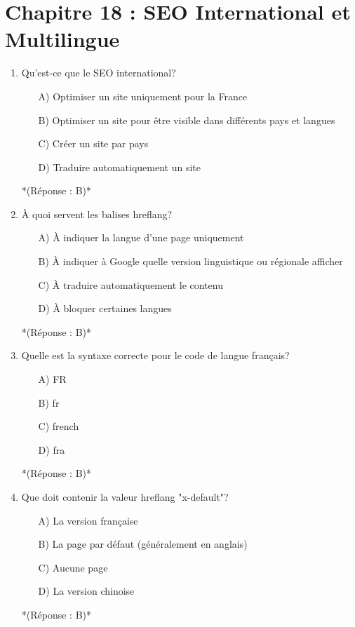 \documentclass[12pt,a4paper,twoside]{report}
\begin{document}
\section*{Chapitre 18 : SEO International et Multilingue}

\begin{enumerate}
\item Qu'est-ce que le SEO international?
\begin{itemize}
\item[A)] Optimiser un site uniquement pour la France
\item[B)] Optimiser un site pour être visible dans différents pays et langues
\item[C)] Créer un site par pays
\item[D)] Traduire automatiquement un site
\end{itemize}
*(Réponse : B)*

\item À quoi servent les balises hreflang?
\begin{itemize}
\item[A)] À indiquer la langue d'une page uniquement
\item[B)] À indiquer à Google quelle version linguistique ou régionale afficher
\item[C)] À traduire automatiquement le contenu
\item[D)] À bloquer certaines langues
\end{itemize}
*(Réponse : B)*

\item Quelle est la syntaxe correcte pour le code de langue français?
\begin{itemize}
\item[A)] FR
\item[B)] fr
\item[C)] french
\item[D)] fra
\end{itemize}
*(Réponse : B)*

\item Que doit contenir la valeur hreflang "x-default"?
\begin{itemize}
\item[A)] La version française
\item[B)] La page par défaut (généralement en anglais)
\item[C)] Aucune page
\item[D)] La version chinoise
\end{itemize}
*(Réponse : B)*


\end{enumerate}
\end{document}
